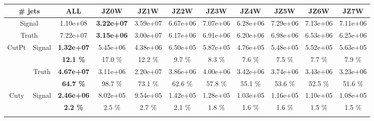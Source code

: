 \begin{appendices}
\begin{landscape} 
\begin{table}
  \centering
  \begin{tabular}{|c|c|>{\bfseries}c|c|c|c|c|c|c|c|c|}
    \hline
     \multicolumn{2}{|c|}{\# jets}  & ALL      & JZ0W     & JZ1W     & JZ2W     & JZ3W     & JZ4W     & JZ5W     & JZ6W     & JZ7W     \\
    \hline                                                              
    \hline                                                              
     \multicolumn{2}{|c|}{Signal}   & 1.10e+08 & 3.22e+07 & 3.59e+07 & 6.67e+06 & 7.07e+06 & 6.28e+06 & 7.29e+06 & 7.13e+06 & 7.11e+06 \\
    \hline                                                              
     \multicolumn{2}{|c|}{Truth}    & 7.22e+07 & 3.15e+06 & 3.00e+07 & 6.17e+06 & 6.91e+06 & 6.20e+06 & 6.98e+06 & 6.53e+06 & 6.25e+06 \\
    \hline                                                              
    \hline                                                              
    \multirow{4}{*}{CutPt}          & \multirow{2}{*}{Signal}   & 1.32e+07 & 5.45e+06 & 4.38e+06 & 6.50e+05 & 5.87e+05 & 4.76e+05 & 5.48e+05 & 5.52e+05 & 5.63e+05 \\
                                    &                           & 12.1 \%  & 17.0 \%  & 12.2 \%  & 9.7 \%   & 8.3 \%   & 7.6 \%   & 7.5 \%   & 7.7 \%   & 7.9 \%   \\
    \cline{2-11}                                                                 
                                    & \multirow{2}{*}{Truth}    & 4.67e+07 & 3.11e+06 & 2.20e+07 & 3.86e+06 & 4.00e+06 & 3.42e+06 & 3.74e+06 & 3.43e+06 & 3.23e+06 \\
                                    &                           & 64.7 \%  & 98.7 \%  & 73.1 \%  & 62.6 \%  & 57.8 \%  & 55.1 \%  & 53.6 \%  & 52.5 \%  & 51.6 \%  \\
    \hline                                                              
    \hline                                                              
    \multirow{4}{*}{Cuty}           & \multirow{2}{*}{Signal}   & 2.46e+06 & 8.02e+05 & 9.54e+05 & 1.42e+05 & 1.28e+05 & 1.03e+05 & 1.16e+05 & 1.10e+05 & 1.08e+05 \\
                                    &                           & 2.2 \%   & 2.5 \%   & 2.7 \%   & 2.1 \%   & 1.8 \%   & 1.6 \%   & 1.6 \%   & 1.5 \%   & 1.5 \%   \\
    \cline{2-11}                                                                                    

\end{tabular}
\end{table}
\end{landscape}
\end{appendices}
